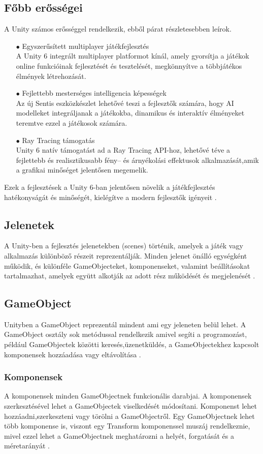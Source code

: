 \documentclass[
]{thesis-ekf}
\theoremstyle{definition}
\theoremstyle{remark}
\begin{document}
\subsection{Főbb erősségei}
A Unity számos erősséggel rendelkezik, ebből párat részletesebben leírok.
\begin{itemize}
	\item[$\bullet$]Egyszerűsített multiplayer játékfejlesztés \\  A Unity 6 integrált multiplayer platformot kínál, amely gyorsítja a játékok online funkcióinak fejlesztését és tesztelését, megkönnyítve a többjátékos élmények létrehozását. 
	\item[$\bullet$]Fejlettebb mesterséges intelligencia képességek \\Az új Sentis eszközkészlet lehetővé teszi a fejlesztők számára, hogy AI modelleket integráljanak a játékokba, dinamikus és interaktív élményeket teremtve ezzel a játékosok számára. 
	\item[$\bullet$]Ray Tracing támogatás \\  Unity 6 natív támogatást ad a Ray Tracing API-hoz, lehetővé téve a fejlettebb és realisztikusabb fény-- és árnyékolási effektusok alkalmazását,amik a grafikai minőséget jelentősen megemelik.
\end{itemize}
Ezek a fejlesztések a Unity 6-ban jelentősen növelik a játékfejlesztés hatékonyságát és minőségét, kielégítve a modern fejlesztők igényeit \cite{Unity6}.


\subsection{Jelenetek}
A Unity-ben a fejlesztés jelenetekben (scenes) történik, amelyek a játék vagy alkalmazás különböző részeit reprezentálják. Minden jelenet önálló egységként működik, és különféle GameObjecteket, komponenseket, valamint beállításokat tartalmazhat, amelyek együtt alkotják az adott rész működését és megjelenését \cite{UnityScene}.
\subsection{GameObject}
Unityben a GameObject reprezentál mindent ami egy jeleneten belül lehet. A GameObject osztály sok metódussal rendelkezik amivel segíti a programozást, például GameObjectek közötti keresés,üzenetküldés, a GameObjectekhez kapcsolt komponensek hozzáadása vagy eltávolítása \cite{UnityGameObject}.

\subsubsection{Komponensek}
A komponensek minden GameObjectnek funkcionális darabjai. A komponensek szerkesztésével lehet a GameObjectek viselkedését módosítani. Komponenst lehet hozzáadni,szerkeszteni vagy törölni a GameObjectről. Egy GameObjectnek lehet több komponense is, viszont egy Transform komponenssel muszáj rendelkeznie, mivel ezzel lehet a GameObjectnek meghatározni a helyét, forgatását és a méretarányát \cite{UnityComponents}.
\end{document}
